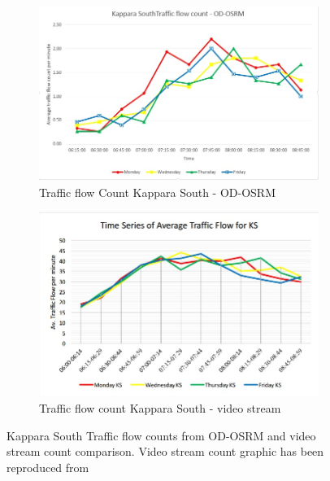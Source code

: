 \documentclass[12pt, a4paper]{report}
\theoremstyle{definition}
\theoremstyle{definition}%
\theoremstyle{definition}%
\theoremstyle{definition}%
\theoremstyle{definition}%
\theoremstyle{definition}%
\begin{document}
\begin{figure}[!] 
	\centering
	\begin{subfigure}{0.6\textwidth}
		\centering
		\includegraphics[width=\linewidth]{traffic_flow_count_KS_MINE.jpg} 
		\caption{\scriptsize{Traffic flow Count Kappara South - OD-OSRM}} 
		\label{fig:traffic_flow_count_KS_MINE}
	\end{subfigure}
	
	\vspace{1cm}
	\begin{subfigure}{0.6\textwidth}
		\centering
		\includegraphics[width=\linewidth]{traffic_flow_count_KS_Nigel_pace.jpg} 
		\caption{\scriptsize{Traffic flow count Kappara South - video stream}}
		\label{fig:traffic_flow_count_KS_NP}
	\end{subfigure}
	\caption{Kappara South Traffic flow counts from OD-OSRM and video stream count comparison. Video stream count graphic has been reproduced from \cite{Pace2017}}
	\label{fig:kappara_south_traffic_flow_line_chart}
\end{figure}
\end{document}
